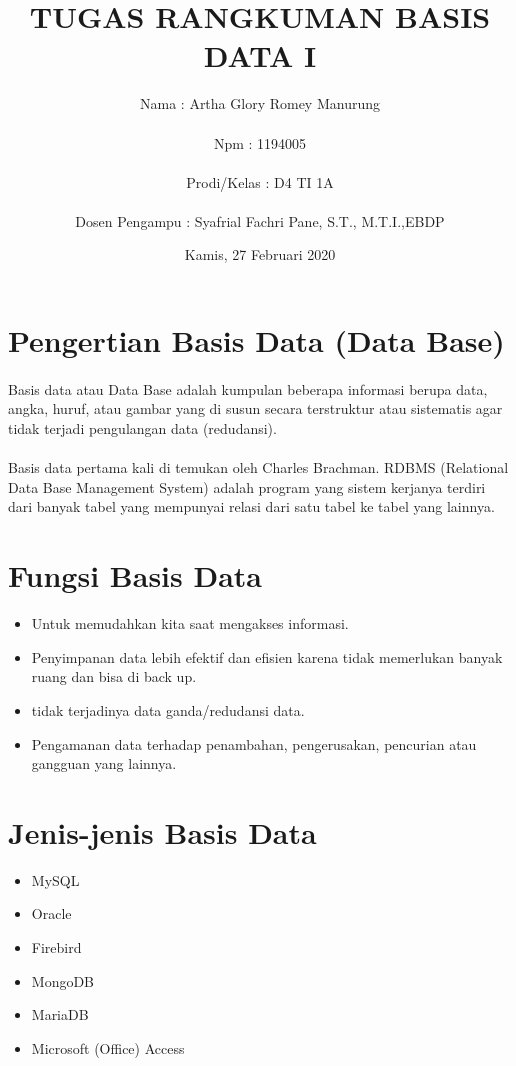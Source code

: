 \documentclass{article}
\title{TUGAS RANGKUMAN BASIS DATA I}
\author{Nama : Artha Glory Romey Manurung \\ \\ Npm : 1194005 \\ \\ Prodi/Kelas : D4 TI 1A \\ \\ Dosen Pengampu : Syafrial Fachri Pane, S.T., M.T.I.,EBDP}
\date{Kamis, 27 Februari 2020}
\begin{document}
\maketitle

\section{Pengertian Basis Data (Data Base)}
\paragraph{}
Basis data atau Data Base adalah kumpulan beberapa informasi berupa data, angka, huruf, atau gambar yang di susun secara terstruktur atau sistematis agar tidak terjadi pengulangan data (redudansi).
\paragraph{}
Basis data pertama kali di temukan oleh Charles Brachman. RDBMS (Relational Data Base Management System) adalah program yang sistem kerjanya terdiri dari banyak tabel yang mempunyai relasi dari satu tabel ke tabel yang lainnya.

\section{Fungsi Basis Data}
\begin{itemize}
    \item Untuk memudahkan kita saat mengakses informasi.
    \item Penyimpanan data lebih efektif dan efisien karena tidak memerlukan banyak ruang dan bisa di back up.
    \item tidak terjadinya data ganda/redudansi data.
    \item Pengamanan data terhadap penambahan, pengerusakan, pencurian atau gangguan yang lainnya.
\end{itemize}

\newpage
\section{Jenis-jenis Basis Data}
\begin{itemize}
    \item MySQL
    \item Oracle
    \item Firebird
    \item MongoDB
    \item MariaDB
    \item Microsoft (Office) Access
\end{itemize}
\end{document}
